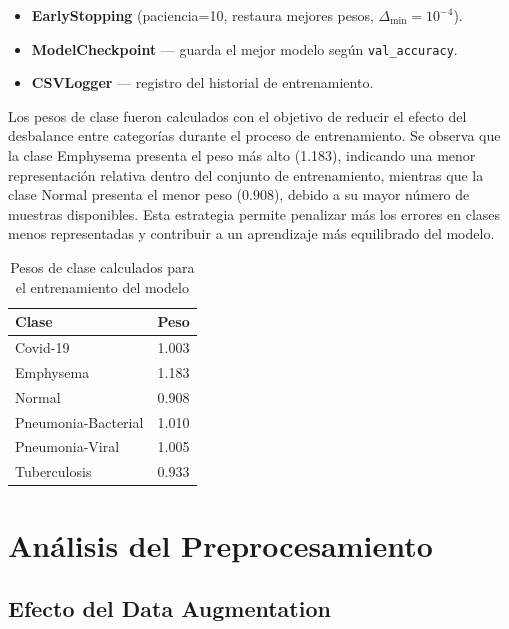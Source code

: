 \documentclass[10pt,twocolumn]{article}
\begin{document}
\begin{itemize}[leftmargin=*,noitemsep,topsep=2pt]
  \item \textbf{EarlyStopping} (paciencia=10, restaura mejores pesos,
        $\Delta_{\min}=10^{-4}$).
  \item \textbf{ModelCheckpoint} — guarda el mejor modelo según
        \texttt{val\_accuracy}.
  \item \textbf{CSVLogger} — registro del historial de entrenamiento.
\end{itemize}

Los pesos de clase fueron calculados con el objetivo de reducir el efecto del 
desbalance entre categorías durante el proceso de entrenamiento. Se observa 
que la clase Emphysema presenta el peso más alto (1.183), indicando una menor 
representación relativa dentro del conjunto de entrenamiento, mientras que la 
clase Normal presenta el menor peso (0.908), debido a su mayor número de 
muestras disponibles. Esta estrategia permite penalizar más los errores en 
clases menos representadas y contribuir a un aprendizaje más equilibrado 
del modelo.

\begin{table}[H]
\centering
\caption{Pesos de clase calculados para el entrenamiento del modelo}
\label{tab:class_weights}

\begin{tabular}{lc}
\hline
\textbf{Clase} & \textbf{Peso} \\
\hline
Covid-19 & 1.003 \\
Emphysema & 1.183 \\
Normal & 0.908 \\
Pneumonia-Bacterial & 1.010 \\
Pneumonia-Viral & 1.005 \\
Tuberculosis & 0.933 \\
\hline
\end{tabular}
\end{table}

\section{Análisis del Preprocesamiento}

\subsection{Efecto del Data Augmentation}
\end{document}
